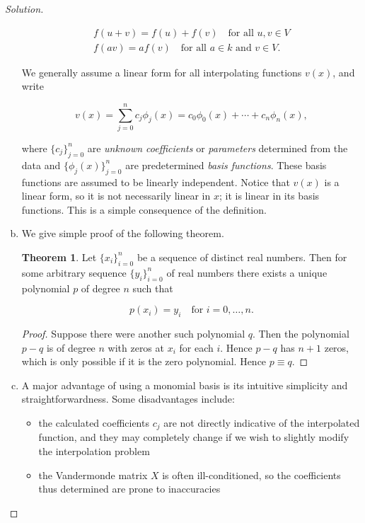 \documentclass[12pt,a4]{article}
\theoremstyle{definition}
\newtheorem*{theorem*}{Theorem}
\begin{document}
\begin{proof}[Solution]
\begin{enumerate}[(a)]
		\begin{gather*}
		f(u + v) = f(u) + f(v) \quad \text{for all } u, v \in V \\
		f(a v) = a f(v) \quad \text{for all } a \in k \text{ and } v \in V {.}
		\end{gather*}
		
		We generally assume a linear form for all interpolating functions $v(x)$, and write 
		
		\[
		v(x) = \sum_{j = 0}^n c_j \phi_j(x) = c_0 \phi_0(x) + \cdots + c_n \phi_n(x) {,}
		\]
		
		where $\{ c_j \}_{j = 0}^n$ are \emph{unknown coefficients} or \emph{parameters} determined from the data and $\{ \phi_j (x) \}_{j  = 0}^n$ are predetermined \emph{basis functions}. These basis functions are assumed to be linearly independent. Notice that $v(x)$ is a linear form, so it is not necessarily linear in $x$; it is linear in its basis functions. This is a simple consequence of the definition. 
		
		\item We give simple proof of the following theorem. 
		
		\begin{theorem*}
			Let $\{ x_i \}_{i = 0}^n$ be a sequence of distinct real numbers. Then for some arbitrary sequence $\{ y_i \}_{i = 0}^n$ of real numbers there exists a unique polynomial $p$ of degree $n$ such that 
			
			\[
			p(x_i) = y_i \quad \text{for } i = 0, \ldots, n {.}
			\]
		\end{theorem*}
		\begin{proof}
			Suppose there were another such polynomial $q$. Then the polynomial $p - q$ is of degree $n$ with zeros at $x_i$ for each $i$. Hence $p - q$ has $n + 1$ zeros, which is only possible if it is the zero polynomial. Hence $p \equiv q$. 
		\end{proof}
		
		\item A major advantage of using a monomial basis is its intuitive simplicity and straightforwardness. Some disadvantages include: 
		
		\begin{itemize}
			\item the calculated coefficients $c_j$ are not directly indicative of the interpolated function, and they may completely change if we wish to slightly modify the interpolation problem
			
			\item the Vandermonde matrix $X$ is often ill-conditioned, so the coefficients thus determined are prone to inaccuracies 
			

\end{itemize}
\end{enumerate}
\end{proof}
\end{document}
